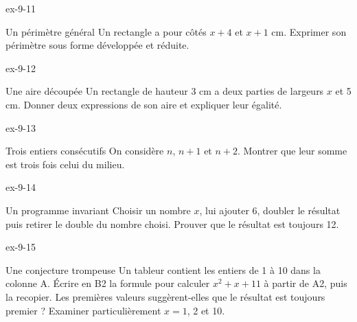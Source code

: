 \begin{blocLivre}{ex-9-11}\begin{exercice}[3]{Un périmètre général}
Un rectangle a pour côtés $x+4$ et $x+1$ cm. Exprimer son périmètre sous forme développée et réduite.
\label{fig-ex-9-11}
\end{exercice}\end{blocLivre}
\begin{blocLivre}{ex-9-12}\begin{exercice}[3]{Une aire découpée}
Un rectangle de hauteur 3 cm a deux parties de largeurs $x$ et 5 cm. Donner deux expressions de son aire et expliquer leur égalité.
\label{fig-ex-9-12}
\end{exercice}\end{blocLivre}
\begin{blocLivre}{ex-9-13}\begin{exercice}[3]{Trois entiers consécutifs}
On considère $n$, $n+1$ et $n+2$. Montrer que leur somme est trois fois celui du milieu.
\end{exercice}\end{blocLivre}
\begin{blocLivre}{ex-9-14}\begin{exercice}[3]{Un programme invariant}
Choisir un nombre $x$, lui ajouter 6, doubler le résultat puis retirer le double du nombre choisi. Prouver que le résultat est toujours 12.
\end{exercice}\end{blocLivre}
\begin{blocLivre}{ex-9-15}\begin{exercice}[3]{Une conjecture trompeuse}
Un tableur contient les entiers de 1 à 10 dans la colonne A. Écrire en B2 la formule pour calculer $x^2+x+11$ à partir de A2, puis la recopier. Les premières valeurs suggèrent-elles que le résultat est toujours premier ? Examiner particulièrement $x=1$, 2 et 10.
\end{exercice}\end{blocLivre}

\clearpage
